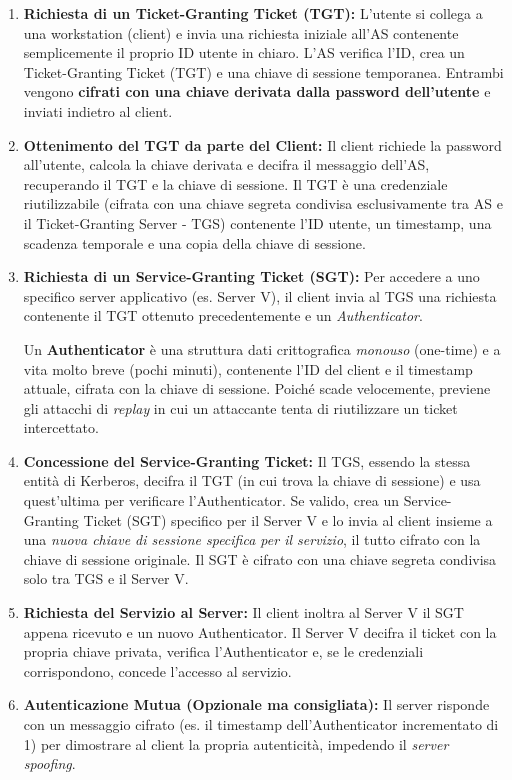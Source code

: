 \begin{enumerate}
    \item \textbf{Richiesta di un Ticket-Granting Ticket (TGT):}
    L'utente si collega a una workstation (client) e invia una richiesta iniziale all'AS contenente semplicemente il proprio ID utente in chiaro. 
    L'AS verifica l'ID, crea un Ticket-Granting Ticket (TGT) e una chiave di sessione temporanea. Entrambi vengono \textbf{cifrati con una chiave derivata dalla password dell'utente} e inviati indietro al client.
    
    \item \textbf{Ottenimento del TGT da parte del Client:}
    Il client richiede la password all'utente, calcola la chiave derivata e decifra il messaggio dell'AS, recuperando il TGT e la chiave di sessione. Il TGT è una credenziale riutilizzabile (cifrata con una chiave segreta condivisa esclusivamente tra AS e il Ticket-Granting Server - TGS) contenente l'ID utente, un timestamp, una scadenza temporale e una copia della chiave di sessione.
    
    \item \textbf{Richiesta di un Service-Granting Ticket (SGT):}
    Per accedere a uno specifico server applicativo (es. Server V), il client invia al TGS una richiesta contenente il TGT ottenuto precedentemente e un \textit{Authenticator}.
    
    \begin{defbox}
    Un \textbf{Authenticator} è una struttura dati crittografica \textit{monouso} (one-time) e a vita molto breve (pochi minuti), contenente l'ID del client e il timestamp attuale, cifrata con la chiave di sessione. Poiché scade velocemente, previene gli attacchi di \textit{replay} in cui un attaccante tenta di riutilizzare un ticket intercettato.
    \end{defbox}
    
    \item \textbf{Concessione del Service-Granting Ticket:}
    Il TGS, essendo la stessa entità di Kerberos, decifra il TGT (in cui trova la chiave di sessione) e usa quest'ultima per verificare l'Authenticator. Se valido, crea un Service-Granting Ticket (SGT) specifico per il Server V e lo invia al client insieme a una \textit{nuova chiave di sessione specifica per il servizio}, il tutto cifrato con la chiave di sessione originale. Il SGT è cifrato con una chiave segreta condivisa solo tra TGS e il Server V.
    
    \item \textbf{Richiesta del Servizio al Server:}
    Il client inoltra al Server V il SGT appena ricevuto e un nuovo Authenticator. Il Server V decifra il ticket con la propria chiave privata, verifica l'Authenticator e, se le credenziali corrispondono, concede l'accesso al servizio. 
    
    \item \textbf{Autenticazione Mutua (Opzionale ma consigliata):}
    Il server risponde con un messaggio cifrato (es. il timestamp dell'Authenticator incrementato di 1) per dimostrare al client la propria autenticità, impedendo il \textit{server spoofing}.
\end{enumerate}

